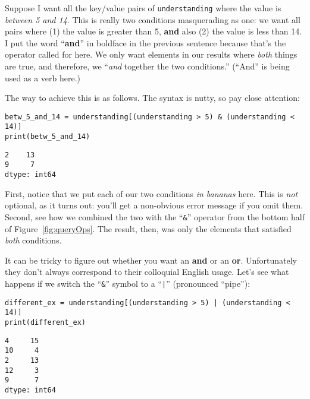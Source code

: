 Suppose I want all the key/value pairs of \texttt{understanding} where the
value is \textit{between 5 and 14}. This is really two conditions masquerading
as one: we want all pairs where (1) the value is greater than 5, \textbf{and}
also (2) the value is less than 14. I put the word ``\textbf{and}'' in boldface
in the previous sentence because that's the operator called for here. We only
want elements in our results where \textit{both} things are true, and
therefore, we ``\textit{and} together the two conditions.'' (``And'' is being
used as a verb here.)

The way to achieve this is as follows. The syntax is nutty, so pay close
attention:

\begin{Verbatim}[fontsize=\small,samepage=true,frame=single,framesep=3mm]
betw_5_and_14 = understanding[(understanding > 5) & (understanding < 14)]
print(betw_5_and_14)
\end{Verbatim}

\begin{Verbatim}[fontsize=\small,samepage=true,frame=leftline,framesep=5mm,framerule=1mm]
2    13
9     7
dtype: int64
\end{Verbatim}

First, notice that we put each of our two conditions \textit{in bananas} here.
This is \textit{not} optional, as it turns out: you'll get a non-obvious error
message if you omit them. Second, see how we combined the two with the
``\texttt{\&}'' operator from the bottom half of Figure~\ref{fig:queryOps}. The
result, then, was only the elements that satisfied \textit{both} conditions.


It can be tricky to figure out whether you want an \textbf{and} or an
\textbf{or}. Unfortunately they don't always correspond to their colloquial
English usage. Let's see what happens if we switch the ``\texttt{\&}'' symbol to
a ``\texttt{|}'' (pronounced ``pipe''):

\begin{Verbatim}[fontsize=\small,samepage=true,frame=single,framesep=3mm]
different_ex = understanding[(understanding > 5) | (understanding < 14)]
print(different_ex)
\end{Verbatim}

\begin{Verbatim}[fontsize=\small,samepage=true,frame=leftline,framesep=5mm,framerule=1mm]
4     15
10     4
2     13
12     3
9      7
dtype: int64
\end{Verbatim}

